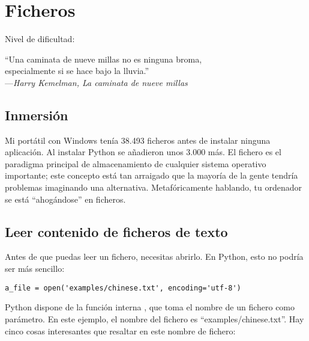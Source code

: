 
\chapter{Ficheros}\label{ch:ficheros}

\noindent
Nivel de dificultad:\diflll

\begin{citaCap}
``Una caminata de nueve millas no es ninguna broma, \\
especialmente si se hace bajo la lluvia.'' \\
---\emph{Harry Kemelman, La caminata de nueve millas}
\end{citaCap}

\section{Inmersión}

Mi portátil con Windows tenía 38.493 ficheros antes de instalar ninguna aplicación. Al instalar Python se añadieron unos 3.000 más. El fichero es el paradigma principal de almacenamiento de cualquier sistema operativo importante; este concepto está tan arraigado que la mayoría de la gente tendría problemas imaginando una alternativa. Metafóricamente hablando, tu ordenador se está ``ahogándose'' en ficheros.

\section{Leer contenido de ficheros de texto}
\label{sec:leer_ficheros}

Antes de que puedas leer un fichero, necesitas abrirlo. En Python, esto no podría ser más sencillo:

\noindent\begin{minipage}{\textwidth}
\begin{lstlisting}[mathescape=True]
a_file = open('examples/chinese.txt', encoding='utf-8')
\end{lstlisting}
\end{minipage}

Python dispone de la función interna , que toma el nombre de un fichero como parámetro. En este ejemplo, el nombre del fichero es ``examples/chinese.txt''. Hay cinco cosas interesantes que resaltar en este nombre de fichero:

